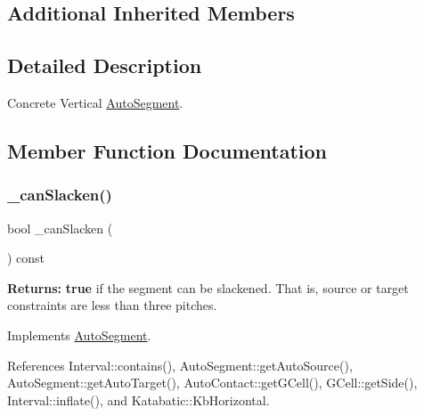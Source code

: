 \subsection*{Additional Inherited Members}


\subsection{Detailed Description}
Concrete Vertical \mbox{\hyperlink{classKatabatic_1_1AutoSegment}{Auto\+Segment}}. 

\subsection{Member Function Documentation}
\mbox{\label{classKatabatic_1_1AutoVertical_a2ced98fb06f208aa88c0962a706e64db}} 
\subsubsection{\texorpdfstring{\+\_\+can\+Slacken()}{\_canSlacken()}}
{\footnotesize\ttfamily bool \+\_\+can\+Slacken (\begin{DoxyParamCaption}{ }\end{DoxyParamCaption}) const\hspace{0.3cm}{\ttfamily [virtual]}}

{\bfseries Returns\+:} {\bfseries true} if the segment can be slackened. That is, source or target constraints are less than three pitches. 

Implements \mbox{\hyperlink{classKatabatic_1_1AutoSegment_a676fcb7ece71d129b7a4d87a3f2e07aa}{Auto\+Segment}}.



References Interval\+::contains(), Auto\+Segment\+::get\+Auto\+Source(), Auto\+Segment\+::get\+Auto\+Target(), Auto\+Contact\+::get\+G\+Cell(), G\+Cell\+::get\+Side(), Interval\+::inflate(), and Katabatic\+::\+Kb\+Horizontal.

\mbox{\label{classKatabatic_1_1AutoVertical_a9b0c21eeb26c256876592ba63438da74}} 
